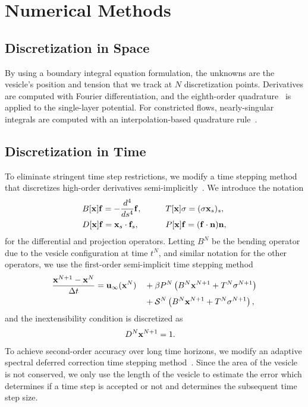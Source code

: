 \documentclass[9pt,twocolumn,twoside,lineno]{pnas-new}
\begin{document}
\section*{Numerical Methods}

\subsection*{Discretization in Space}
By using a boundary integral equation formulation, the unknowns are the
vesicle's position and tension that we track at $N$ discretization
points. Derivatives are computed with Fourier differentiation, and the
eighth-order quadrature~\cite{alp1999} is applied to the single-layer
potential. For constricted flows, nearly-singular integrals are computed
with an interpolation-based quadrature rule~\cite{qua-bir2014}.

\subsection*{Discretization in Time}
To eliminate stringent time step restrictions, we modify a time stepping
method that discretizes high-order derivatives
semi-implicitly~\cite{vee-gue-zor-bir2009}. We introduce the notation
\begin{alignat}{3}
  &B[\mathbf{x}]\mathbf{f} = -\frac{d^4}{ds^4} \mathbf{f},  \qquad
  &&T[\mathbf{x}]\sigma = (\sigma \mathbf{x}_s)_s, \\
  &D[\mathbf{x}]\mathbf{f} = \mathbf{x}_s \cdot \mathbf{f}_s, 
  &&P[\mathbf{x}]\mathbf{f} = (\mathbf{f} \cdot \mathbf{n}) \mathbf{n},
\end{alignat}
for the differential and projection operators. Letting $B^N$ be the
bending operator due to the vesicle configuration at time $t^N$, and
similar notation for the other operators, we use the first-order
semi-implicit time stepping method
\begin{alignat}{3}  
  \frac{\mathbf{x}^{N+1} - \mathbf{x}^N}{\Delta t} &= \mathbf{u}_\infty(\mathbf{x}^N) 
  &&+ \beta P^N\left(B^N\mathbf{x}^{N+1} + T^N\sigma^{N+1}\right) \nonumber \\
  & &&+ \mathcal{S}^N\left(B^N\mathbf{x}^{N+1} + T^N\sigma^{N+1}\right), 
\end{alignat}
and  the inextensibility condition is discretized as
\begin{align}
  D^N\mathbf{x}^{N+1} &= 1.
\end{align}
To achieve second-order accuracy over long time horizons, we modify an
adaptive spectral deferred correction time stepping
method~\cite{qua-bir2016}. Since the area of the vesicle is not
conserved, we only use the length of the vesicle to estimate the error
which determines if a time step is accepted or not and determines the
subsequent time step size.
\end{document}
